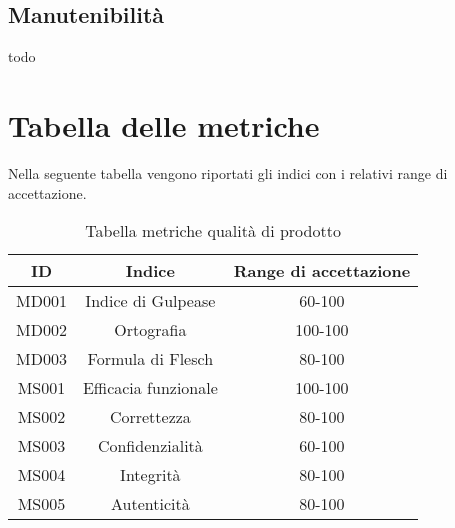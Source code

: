 \subsection{Manutenibilità}
todo
\section{Tabella delle metriche}
Nella seguente tabella vengono riportati gli indici con i relativi range di accettazione.\\
\begin{table}[h]
    \begin{center}
      \begin{tabular}{|c|c|c|}
        \hline
        \textbf{ID} & \textbf{Indice}       & \textbf{Range di accettazione}\\
        \hline
        MD001       & Indice di Gulpease    & 60-100\\
        MD002       & Ortografia            & 100-100\\
        MD003       & Formula di Flesch     & 80-100\\\hline
        MS001       & Efficacia funzionale  & 100-100\\
        MS002       & Correttezza  			& 80-100\\
        MS003       & Confidenzialità 	 	& 60-100\\
        MS004       & Integrità  			& 80-100\\
        MS005       & Autenticità		    & 80-100\\
            
        \hline
      \end{tabular}
      \caption{Tabella metriche qualità di prodotto}
    \end{center}
\end{table}